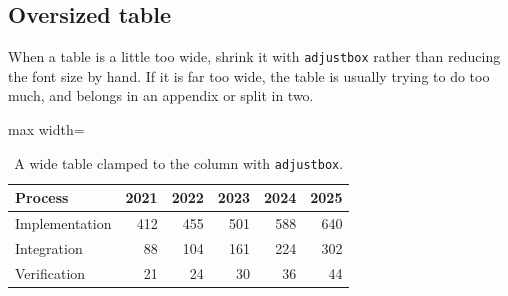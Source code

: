 \subsection{Oversized table}
When a table is a little too wide, shrink it with \verb|adjustbox| rather than reducing the font size by hand.
If it is far too wide, the table is usually trying to do too much, and belongs in an appendix or split in two.

\begin{table}[t]
  \centering
  \caption{A wide table clamped to the column with \texttt{adjustbox}.}
  \label{tab:clamped}
  \begin{adjustbox}{max width=\columnwidth}
    \begin{tabular}{lrrrrr}
      \toprule
      Process & 2021 & 2022 & 2023 & 2024 & 2025 \\
      \midrule
      Implementation & 412 & 455 & 501 & 588 & 640 \\
      Integration    &  88 & 104 & 161 & 224 & 302 \\
      Verification   &  21 &  24 &  30 &  36 &  44 \\
      \bottomrule
    \end{tabular}
  \end{adjustbox}
\end{table}
